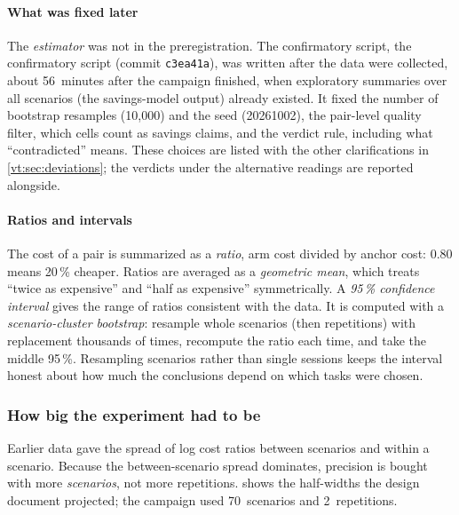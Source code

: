 \documentclass[11pt,letterpaper]{article}
\newcommand{\term}[1]{\emph{#1}}
\newcommand{\code}[1]{\texttt{#1}}
\newcommand{\Boot}{10{,}000}
\newcommand{\BootSeed}{20261002}
\newcommand{\ConfirmAfterMin}{56}
\newcommand{\ConfirmSha}{c3ea41a}
\newcommand{\NReps}{2}
\newcommand{\NScenarios}{70}
\begin{document}
\paragraph{What was fixed later} The \emph{estimator} was not in the preregistration. The confirmatory
script, the confirmatory script (commit \code{\ConfirmSha}), was written after the data were
collected, about \ConfirmAfterMin\ minutes after the campaign finished, when exploratory summaries over all
scenarios (the savings-model output) already existed. It fixed the number of bootstrap
resamples (\Boot) and the seed (\BootSeed), the pair-level quality filter, which cells count as savings
claims, and the verdict rule, including what ``contradicted'' means. These choices are listed with the other
clarifications in \cref{vt:sec:deviations}; the verdicts under the alternative readings are reported alongside.

\paragraph{Ratios and intervals} The cost of a pair is summarized as a \term{ratio}, arm cost divided by
anchor cost: 0.80 means 20\,\% cheaper. Ratios are averaged as a \term{geometric mean}, which treats
``twice as expensive'' and ``half as expensive'' symmetrically. A \term{95\,\% confidence interval} gives
the range of ratios consistent with the data. It is computed with a \term{scenario-cluster bootstrap}:
resample whole scenarios (then repetitions) with replacement thousands of times, recompute the ratio each
time, and take the middle 95\,\%. Resampling scenarios rather than single sessions keeps the interval
honest about how much the conclusions depend on which tasks were chosen.

\subsubsection{How big the experiment had to be}\label{vt:sec:power}

Earlier data gave the spread of log cost ratios between scenarios and within a scenario. Because the
between-scenario spread dominates, precision is bought with more \emph{scenarios}, not more repetitions.
 shows the half-widths the design document projected; the campaign used \NScenarios\
scenarios and \NReps\ repetitions.
\end{document}
